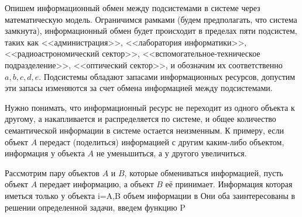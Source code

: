 Опишем информационный обмен между подсистемами в системе через математическую модель. Ограничимся рамками (будем предполагать, что система замкнута), информационный обмен будет  происходит в пределах пяти подсистем, таких как <<администрация>>, <<лаборатория информатики>>, <<радиоастрономический сектор>>, <<вспомогательное-техническое подразделение>>, <<оптический сектор>>, и обозначим их соответственно $a, b, c, d, e$. Подсистемы обладают запасами информационных ресурсов, допустим эти запасы изменяются за счет обмена информацией между подсистемами. 

Нужно понимать, что информационный ресурс не переходит из одного объекта к другому, а накапливается и распределяется по системе, и общее количество семантической информации в системе остается неизменным. К примеру, если объект $A$ передаст (поделиться) информацией с другим каким-либо объектом, информация у объекта $A$ не уменьшиться, а у другого увеличиться.

Рассмотрим пару объектов $A$ и $B$, которые обмениваться информацией, пусть объект $A$ передает информацию, а объект $B$ её принимает. Информация которая иметься только у объекта i={A,B}  объем информации в Они оба заинтересованы в решении определенной задачи, введем функцию P   

 


\pagebreak
